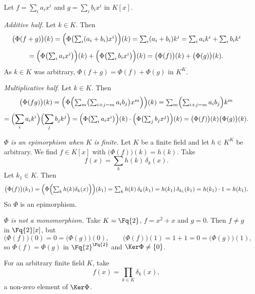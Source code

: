 \documentclass[11pt]{article}
\begin{document}
\begin{solution}
  Let $f = \sum_{i} a_{i}x^{i}$ and $g = \sum_{i} b_{i}x^{i}$ in $K[x]$.

  \emph{Additive half.} Let $k \in K$. Then
  \[
    \bigl(\Phi(f+g)\bigr)(k)
      = \Bigl(\Phi\bigl(\textstyle\sum_{i}(a_{i}+b_{i})x^{i}\bigr)\Bigr)(k)
      = \sum_{i}(a_{i}+b_{i})k^{i}
      = \sum_{i} a_{i}k^{i} + \sum_{i} b_{i}k^{i}
  \]
  \[
      = \Bigl(\Phi\bigl(\textstyle\sum_{i} a_{i}x^{i}\bigr)\Bigr)(k)
        + \Bigl(\Phi\bigl(\textstyle\sum_{i} b_{i}x^{i}\bigr)\Bigr)(k)
      = \bigl(\Phi(f)\bigr)(k) + \bigl(\Phi(g)\bigr)(k).
  \]
  As $k \in K$ was arbitrary, $\Phi(f+g) = \Phi(f) + \Phi(g)$ in $K^{K}$.

  \emph{Multiplicative half.} Let $k \in K$. Then
  \[
    \bigl(\Phi(fg)\bigr)(k)
      = \Bigl(\Phi\Bigl(\textstyle\sum_{m}
          \bigl(\sum_{i+j=m} a_{i}b_{j}\bigr)x^{m}\Bigr)\Bigr)(k)
      = \sum_{m}\Bigl(\sum_{i+j=m} a_{i}b_{j}\Bigr)k^{m}
  \]
  \[
      = \Bigl(\sum_{i} a_{i}k^{i}\Bigr)\Bigl(\sum_{j} b_{j}k^{j}\Bigr)
      = \Bigl(\Phi\bigl(\textstyle\sum_{i} a_{i}x^{i}\bigr)\Bigr)(k)
        \cdot \Bigl(\Phi\bigl(\textstyle\sum_{j} b_{j}x^{j}\bigr)\Bigr)(k)
      = \bigl(\Phi(f)\bigr)(k)\bigl(\Phi(g)\bigr)(k).
  \]

  \emph{$\Phi$ is an epimorphism when $K$ is finite.} Let $K$ be a finite field
  and let $h \in K^{K}$ be arbitrary. We find $f \in K[x]$ with
  $\bigl(\Phi(f)\bigr)(k) = h(k)$. Take
  \[
    f(x) = \sum_{k} h(k)\,\delta_{k}(x).
  \]
  Let $k_{1} \in K$. Then
  \[
    \bigl(\Phi(f)\bigr)(k_{1})
      = \Bigl(\Phi\Bigl(\textstyle\sum_{k} h(k)\delta_{k}(x)\Bigr)\Bigr)(k_{1})
      = \sum_{k} h(k)\,\delta_{k}(k_{1})
      = h(k_{1})\,\delta_{k_{1}}(k_{1})
      = h(k_{1}) \cdot 1
      = h(k_{1}).
  \]
  So $\Phi$ is an epimorphism.

  \emph{$\Phi$ is not a monomorphism.} Take $K = \Fq{2}$, $f = x^{2} + x$ and
  $g = 0$. Then $f \neq g$ in $\Fq{2}[x]$, but
  \[
    \bigl(\Phi(f)\bigr)(0) = 0 = \bigl(\Phi(g)\bigr)(0),
    \qquad
    \bigl(\Phi(f)\bigr)(1) = 1 + 1 = 0 = \bigl(\Phi(g)\bigr)(1),
  \]
  so $\Phi(f) = \Phi(g)$ in $\Fq{2}^{\Fq{2}}$ and $\Ker \Phi \neq \{0\}$.

  For an arbitrary finite field $K$, take
  \[
    f(x) = \prod_{k \in K} \delta_{k}(x),
  \]
  a non-zero element of $\Ker \Phi$.
\end{solution}
\end{document}
